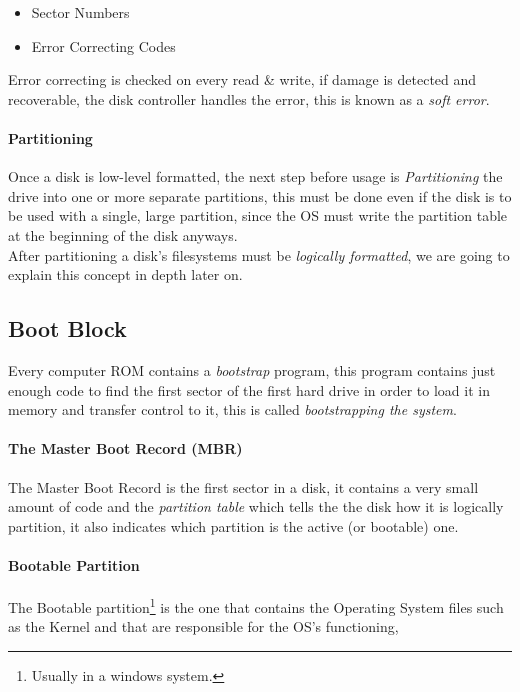 \documentclass[openright, twoside]{report}
\theoremstyle{definition}
\theoremstyle{example}
\begin{document}
\begin{itemize}
	\item Sector Numbers 
	\item Error Correcting Codes
\end{itemize}

Error correcting is checked on every read \& write, if damage is detected and recoverable, the 
disk controller handles the error, this is known as a \emph{soft error}.

\paragraph{Partitioning}
Once a disk is low-level formatted, the next step before usage is \emph{Partitioning} the drive 
into one or more separate partitions, this must be done even if the disk is to be used 
with a single, large partition, since the OS must write the partition table at the beginning 
of the disk anyways.\\

After partitioning a disk's filesystems must be \emph{logically formatted}, we are going to 
explain this concept in depth later on. 

\subsection{Boot Block}
Every computer ROM contains a \emph{bootstrap} program, this program 
contains just enough code to find the first sector of the first hard 
drive in order to load it in memory and transfer control to it, this is 
called \emph{bootstrapping the system}.

\paragraph{The Master Boot Record (MBR)}
The Master Boot Record is the first sector in a disk, it contains 
a very small amount of code and the \emph{partition table} which 
tells the the disk how it is logically partition, it also indicates 
which partition is the active (or bootable) one.

\paragraph{Bootable Partition}
The Bootable partition\footnote{Usually  in a windows system.} 
is the one that contains the Operating System files such as the 
Kernel and  that are responsible for the OS's functioning,
\end{document}
